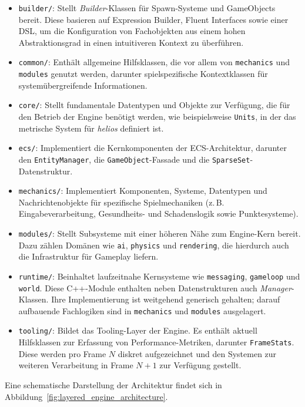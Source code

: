 \begin{itemize}
    \itemsep0.5em
    \item \texttt{builder/}: Stellt \textit{Builder}-Klassen für Spawn-Systeme und GameObjects bereit.
    Diese basieren auf Expression Builder, Fluent Interfaces sowie einer DSL, um die Konfiguration von Fachobjekten aus einem hohen Abstraktionsgrad in einen intuitiveren Kontext zu überführen.
    \item \texttt{common/}: Enthält allgemeine Hilfsklassen, die vor allem von \texttt{mechanics} und \texttt{modules} genutzt werden, darunter spielspezifische Kontextklassen für systemübergreifende Informationen.
    \item \texttt{core/}: Stellt fundamentale Datentypen und Objekte zur Verfügung, die für den Betrieb der Engine benötigt werden, wie beispielsweise \texttt{Units}, in der das metrische System für \textit{helios} definiert ist.
    \item \texttt{ecs/}: Implementiert die Kernkomponenten der ECS-Architektur, darunter den \texttt{EntityManager}, die \texttt{GameObject}-Fassade und die \texttt{SparseSet}-Datenstruktur.
    \item \texttt{mechanics/}: Implementiert Komponenten, Systeme, Datentypen und Nachrichtenobjekte für spezifische Spielmechaniken (z.\,B. Eingabeverarbeitung, Gesundheits- und Schadenslogik sowie Punktesysteme).
    \item \texttt{modules/}: Stellt Subsysteme mit einer höheren Nähe zum Engine-Kern bereit.
    Dazu zählen Domänen wie \texttt{ai}, \texttt{physics} und \texttt{rendering}, die hierdurch auch die Infrastruktur für Gameplay liefern.
    \item \texttt{runtime/}: Beinhaltet laufzeitnahe Kernsysteme wie \texttt{messaging}, \texttt{gameloop} und \texttt{world}.
    Diese C++-Module enthalten neben Datenstrukturen auch \textit{Manager}-Klassen.
    Ihre Implementierung ist weitgehend generisch gehalten; darauf aufbauende Fachlogiken sind in \texttt{mechanics} und \texttt{modules} ausgelagert.
    \item \texttt{tooling/}: Bildet das Tooling-Layer der Engine.
    Es enthält aktuell Hilfsklassen zur Erfassung von Performance-Metriken, darunter \texttt{FrameStats}.
    Diese werden pro Frame $N$ diskret aufgezeichnet und den Systemen zur weiteren Verarbeitung in Frame $N+1$ zur Verfügung gestellt.
\end{itemize}

Eine schematische Darstellung der Architektur findet sich in Abbildung~\ref{fig:layered_engine_architecture}.


